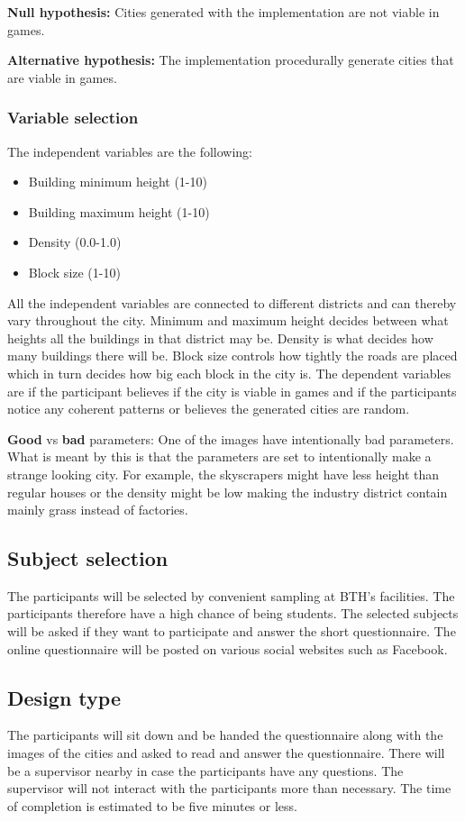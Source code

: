 	\textbf{Null hypothesis:} Cities generated with the implementation are not viable in games.
			
	\textbf{Alternative hypothesis:} The implementation procedurally generate cities that are viable in games.
			
	\subsubsection*{Variable selection}
	The independent variables are the following:
	\begin{itemize}
		\item Building minimum height (1-10)
		\item Building maximum height (1-10)
		\item Density (0.0-1.0)
		\item Block size (1-10)
	\end{itemize}
	All the independent variables are connected to different districts and can thereby vary throughout the city. Minimum and maximum height decides between what heights all the buildings in that district may be. Density is what decides how many buildings there will be. Block size controls how tightly the roads are placed which in turn decides how big each block in the city is. The dependent variables are if the participant believes if the city is viable in games and if the participants notice any coherent patterns or believes the generated cities are random.
			
	\textbf{Good} vs \textbf{bad} parameters: One of the images have intentionally bad parameters. What is meant by this is that the parameters are set to intentionally make a strange looking city. For example, the skyscrapers might have less height than regular houses or the density might be low making the industry district contain mainly grass instead of factories.
			
	\subsection*{Subject selection}
	The participants will be selected by convenient sampling at BTH’s facilities. The participants therefore have a high chance of being students. The selected subjects will be asked if they want to participate and answer the short questionnaire. The online questionnaire will be posted on various social websites such as Facebook.
			
	\subsection*{Design type}
	The participants will sit down and be handed the questionnaire along with the images of the cities and asked to read and answer the questionnaire. There will be a supervisor nearby in case the participants have any questions. The supervisor will not interact with the participants more than necessary.  The time of completion is estimated to be five minutes or less.
			
